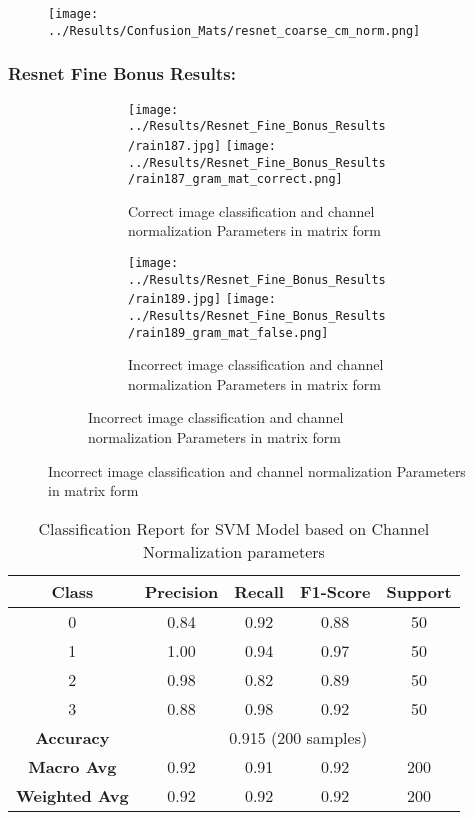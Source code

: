 \documentclass{article}
\begin{document}
\begin{figure}[H]
    \centering
    \texttt{[image: ../Results/Confusion\_Mats/resnet\_coarse\_cm\_norm.png]}
\end{figure}

\subsubsection{Resnet Fine Bonus Results:}
\begin{figure}[H]
    \centering
    \begin{subfigure}{\linewidth}
        \centering
        \begin{subfigure}{0.49\linewidth}
            \centering
            \texttt{[image: ../Results/Resnet\_Fine\_Bonus\_Results/rain187.jpg]}
            \texttt{[image: ../Results/Resnet\_Fine\_Bonus\_Results/rain187\_gram\_mat\_correct.png]}
            \caption*{Correct image classification and channel normalization Parameters in matrix form}
        \end{subfigure}
        \begin{subfigure}{0.49\linewidth}
            \centering
            \texttt{[image: ../Results/Resnet\_Fine\_Bonus\_Results/rain189.jpg]}
            \texttt{[image: ../Results/Resnet\_Fine\_Bonus\_Results/rain189\_gram\_mat\_false.png]}
            \caption*{Incorrect image classification and channel normalization Parameters in matrix form}
        \end{subfigure}
    \end{subfigure}
\end{figure}

\begin{table}[h!]
    \centering
    \begin{tabular}{|c|c|c|c|c|}
        \hline
        Class & Precision & Recall & F1-Score & Support \\
        \hline
        0 & 0.84 & 0.92 & 0.88 & 50 \\
        1 & 1.00 & 0.94 & 0.97 & 50 \\
        2 & 0.98 & 0.82 & 0.89 & 50 \\
        3 & 0.88 & 0.98 & 0.92 & 50 \\
        \hline
        \multicolumn{1}{|c|}{\textbf{Accuracy}} & \multicolumn{4}{c|}{0.915 (200 samples)} \\
        \hline
        \multicolumn{1}{|c|}{\textbf{Macro Avg}} & 0.92 & 0.91 & 0.92 & 200 \\
        \multicolumn{1}{|c|}{\textbf{Weighted Avg}} & 0.92 & 0.92 & 0.92 & 200 \\
        \hline
    \end{tabular}
    \caption{Classification Report for SVM Model based on Channel Normalization parameters}
\end{table}
\end{document}
